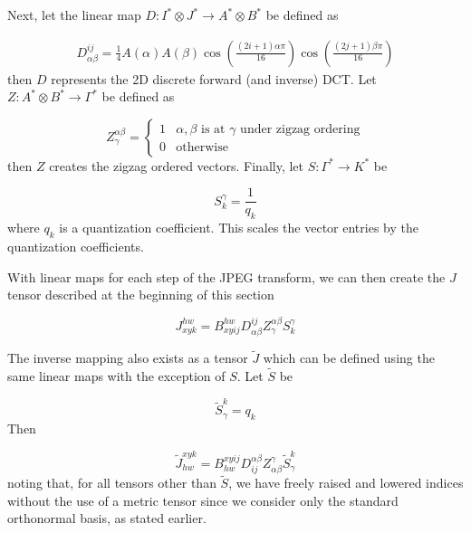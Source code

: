 \documentclass[10pt,twocolumn,letterpaper]{article}
\begin{document}
Next, let the linear map $D: I^* \otimes J^* \rightarrow A^* \otimes B^*$ be defined as 

\begin{align}
D^{ij}_{\alpha\beta} = \frac{1}{4}A(\alpha)A(\beta)\cos\left(\frac{(2i+1)\alpha\pi}{16}\right)\cos\left(\frac{(2j+1)\beta\pi}{16}\right) 
\end{align}
then $D$ represents the 2D discrete forward (and inverse) DCT. Let $Z: A^* \otimes B^* \rightarrow \Gamma^*$ be defined as 

\begin{equation}
Z^{\alpha\beta}_\gamma = \left\{ \begin{array}{lr} 1 & \text{$\alpha, \beta$ is at $\gamma$ under zigzag ordering} \\ 0 & \text{otherwise} \end{array} \right.
\end{equation}
then $Z$ creates the zigzag ordered vectors. Finally, let $S: \Gamma^* \rightarrow K^*$ be

\begin{equation}
    S^\gamma_k = \frac{1}{q_k}
\end{equation}
where $q_k$ is a quantization coefficient. This scales the vector entries by the quantization coefficients.

With linear maps for each step of the JPEG transform, we can then create the $J$ tensor described at the beginning of this section

\begin{equation}
J^{hw}_{xyk} = B^{hw}_{xyij}D^{ij}_{\alpha\beta}Z^{\alpha\beta}_{\gamma}S^\gamma_k
\end{equation}

The inverse mapping also exists as a tensor $\widetilde{J}$ which can be defined using the same linear maps with the exception of $S$. Let $\widetilde{S}$ be

\begin{equation}
\widetilde{S}^k_\gamma = q_k
\end{equation}
Then 

\begin{equation}
    \widetilde{J}^{xyk}_{hw} = B_{hw}^{xyij}D_{ij}^{\alpha\beta}Z_{\alpha\beta}^{\gamma}\widetilde{S}^k_\gamma
\end{equation}
noting that, for all tensors other than $\widetilde{S}$, we have freely raised and lowered indices without the use of a metric tensor since we consider only the standard orthonormal basis, as stated earlier.
\end{document}
